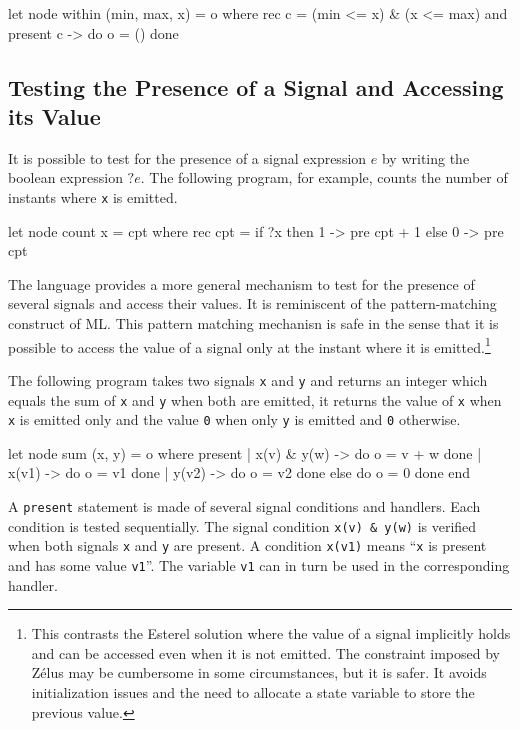 \documentclass[11pt,titlepage,twoside]{report}
\newcommand{\zelus}{{\sf Z\'elus}}
\newcommand{\esterel}{{\sf Esterel}}
\begin{document}
\begin{runverbatim}
let node within (min, max, x) = o where
  rec c = (min <= x) & (x <= max)
  and present c -> do o = () done
\end{runverbatim}

\subsection{Testing the Presence of a Signal and Accessing its Value}
It is possible to test for the presence of a signal expression $e$ by
writing the boolean expression $? e$. The following program, for
example, counts the number of instants where \verb-x- is emitted.
\begin{runverbatim}[withresult]
let node count x = cpt where
  rec cpt = if ?x then 1 -> pre cpt + 1 else 0 -> pre cpt
\end{runverbatim}

The language provides a more general mechanism to test for the
presence of several signals and access their values. It is reminiscent
of the pattern-matching construct of ML.  This pattern matching
mechanisn is safe in the sense that it is possible to access the value
of a signal only at the instant where it is emitted.\footnote{This
  contrasts the \esterel{} solution where the value of a signal
  implicitly holds and can be accessed even when it is not
  emitted. The constraint imposed by \zelus{} may be cumbersome in some circumstances,
  but it is safer. It avoids initialization issues and
  the need to allocate a state variable to store the previous
  value.}

The following program takes two signals \verb-x- and \verb-y- and
returns an integer which equals the sum of \verb-x- and \verb-y- when
both are emitted, it returns the value of \verb-x- when \verb-x- is
emitted only and the value \verb-0- when only \verb-y- is emitted and
\verb-0- otherwise.
\begin{runverbatim}[withresult]
let node sum (x, y) = o where
  present
  | x(v) & y(w) -> do o = v + w done
  | x(v1) -> do o = v1 done
  | y(v2) -> do o = v2 done
  else do o = 0 done
  end
\end{runverbatim}
A \verb-present- statement is made of several signal conditions and
handlers. Each condition is tested sequentially. The signal condition
\verb-x(v) & y(w)- is verified when both signals \verb-x- and \verb-y-
are present. A condition \verb-x(v1)- means ``\verb-x- is present and
has some value \verb-v1-''. The variable \verb-v1- can in turn be used
in the corresponding handler.
\end{document}
